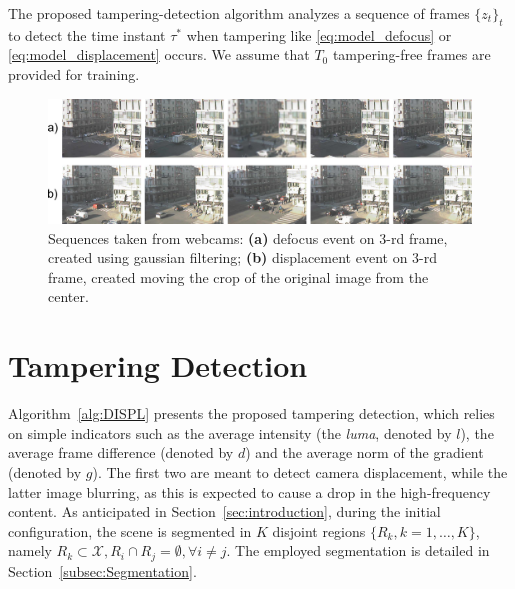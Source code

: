 \documentclass{llncs}
\begin{document}
The proposed tampering-detection algorithm analyzes a sequence of frames $\{z_t\}_t$ to detect the time instant $\tau^*$ when tampering like \eqref{eq:model_defocus} or \eqref{eq:model_displacement} occurs. We assume that $T_0$ tampering-free frames are provided for training.

\begin{figure}[t]
\centering
\includegraphics[width=1\linewidth]{Immagini/sequenze}
\caption{Sequences taken from webcams: \textbf{(a)} defocus event on 3-rd frame, created using gaussian filtering; \textbf{(b)} displacement event on 3-rd frame, created moving the crop of the original image from the center.}
\label{fig:sequences}
\end{figure}

\section{Tampering Detection}\label{sec:propSol}

Algorithm~\ref{alg:DISPL} presents the proposed tampering detection, which relies on simple indicators such as the average intensity (the \emph{luma}, denoted by $l$), the average frame difference (denoted by $d$) and the average norm of the gradient (denoted by $g$). The first two are meant to detect camera displacement, while the latter image blurring, as this is expected to cause a drop in the high-frequency content. As anticipated in Section~\ref{sec:introduction}, during the initial configuration, the scene is segmented in $K$ disjoint regions $\{R_k, k = 1,\dots,K\}$, namely $R_k \subset \mathcal{X}, R_i \cap R_j = \emptyset, \forall i \neq j$. The employed segmentation is detailed in Section~\ref{subsec:Segmentation}. 
\end{document}
